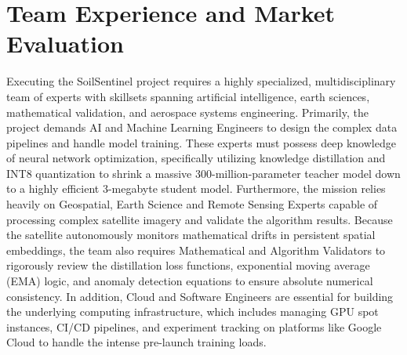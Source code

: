 \documentclass[11pt,letterpaper]{article}
\theoremstyle{plain}
\theoremstyle{definition}
\theoremstyle{remark}
\begin{document}
\section{Team Experience and Market Evaluation}
Executing the SoilSentinel project requires a highly specialized, multidisciplinary team of experts with skillsets spanning artificial intelligence, earth sciences, mathematical validation, and aerospace systems engineering. Primarily, the project demands AI and Machine Learning Engineers to design the complex data pipelines and handle model training. These experts must possess deep knowledge of neural network optimization, specifically utilizing knowledge distillation and INT8 quantization to shrink a massive 300-million-parameter teacher model down to a highly efficient 3-megabyte student model. Furthermore, the mission relies heavily on Geospatial, Earth Science and Remote Sensing Experts capable of processing complex satellite imagery and validate the algorithm results. Because the satellite autonomously monitors mathematical drifts in persistent spatial embeddings, the team also requires Mathematical and Algorithm Validators to rigorously review the distillation loss functions, exponential moving average (EMA) logic, and anomaly detection equations to ensure absolute numerical consistency. In addition, Cloud and Software Engineers are essential for building the underlying computing infrastructure, which includes managing GPU spot instances, CI/CD pipelines, and experiment tracking on platforms like Google Cloud to handle the intense pre-launch training loads. 
\end{document}

